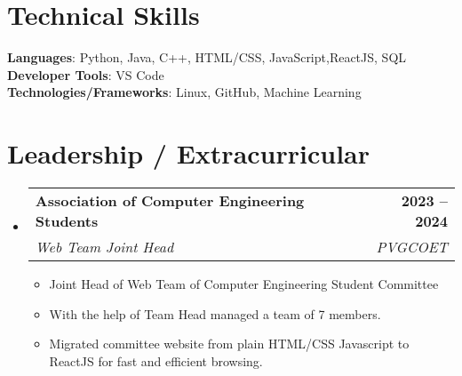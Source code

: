 \documentclass[letterpaper,11pt]{article}
\makeatletter
\newcommand{\resumeItem}[1]{
  \item\small{
    {#1 \vspace{-2pt}}
  }
}
\newcommand{\resumeSubheading}[4]{
  \vspace{-2pt}\item
    \begin{tabular*}{1.0\textwidth}[t]{l@{\extracolsep{\fill}}r}
      \textbf{#1} & \textbf{\small #2} \\
      \textit{\small#3} & \textit{\small #4} \\
    \end{tabular*}\vspace{-7pt}
}
\newcommand{\resumeSubHeadingListStart}{\begin{itemize}[leftmargin=0.0in, label={}]}
\newcommand{\resumeSubHeadingListEnd}{\end{itemize}}
\newcommand{\resumeItemListStart}{\begin{itemize}}
\newcommand{\resumeItemListEnd}{\end{itemize}\vspace{-5pt}}
\makeatother
\begin{document}
%
\section{Technical Skills}
 \begin{itemize}[leftmargin=0.15in, label={}]
    \small{\item{
     \textbf{Languages}{: Python, Java, C++, HTML/CSS, JavaScript,ReactJS, SQL} \\
     \textbf{Developer Tools}{: VS Code} \\
     \textbf{Technologies/Frameworks}{: Linux, GitHub, Machine Learning} \\
    }}
 \end{itemize}
 \vspace{-16pt}


\section{Leadership / Extracurricular}
    \resumeSubHeadingListStart
        \resumeSubheading{Association of Computer Engineering Students}{2023 -- 2024}{Web Team Joint Head}{PVGCOET}
            \resumeItemListStart
                \resumeItem{Joint Head of Web Team of Computer Engineering Student Committee}
                \resumeItem{With the help of Team Head managed a team of 7 members.}
                \resumeItem{Migrated committee website from plain HTML/CSS Javascript to ReactJS for fast and efficient browsing.}
            \resumeItemListEnd
        
    \resumeSubHeadingListEnd
\end{document}
